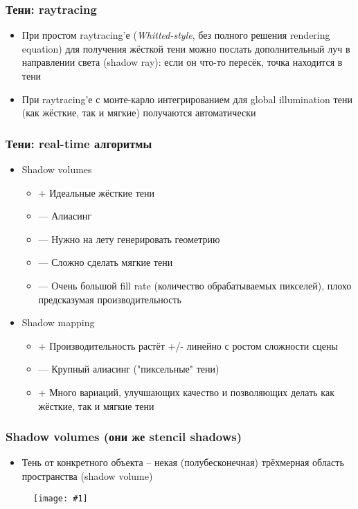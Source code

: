 \documentclass{beamer}
\newcommand{\slideimage}[1]{
  \begin{figure}
    \begin{adjustbox}{width=\textwidth, totalheight=\textheight-2\baselineskip-2\baselineskip,keepaspectratio}
      \texttt{[image: \#1]}
    \end{adjustbox}
  \end{figure}
}
\begin{document}
\begin{frame}[fragile]
\frametitle{Тени: raytracing}
\begin{itemize}
\item При простом raytracing'е (\textit{Whitted-style}, без полного решения rendering equation) для получения жёсткой тени можно послать дополнительный луч в направлении света (shadow ray): если он что-то пересёк, точка находится в тени
\pause
\item При raytracing'е с монте-карло интегрированием для global illumination тени (как жёсткие, так и мягкие) получаются автоматически
\end{itemize}
\end{frame}

\begin{frame}[fragile]
\frametitle{Тени: real-time алгоритмы}
\begin{itemize}
\item Shadow volumes
\pause
\begin{itemize}
\item {\color{green}+} Идеальные жёсткие тени
\item {\color{red}---} Алиасинг
\item {\color{red}---} Нужно на лету генерировать геометрию
\item {\color{red}---} Сложно сделать мягкие тени
\item {\color{red}---} Очень большой fill rate (количество обрабатываемых пикселей), плохо предсказумая производительность
\end{itemize}
\pause
\item Shadow mapping
\pause
\begin{itemize}
\item {\color{green}+} Производительность растёт +/- линейно с ростом сложности сцены
\item {\color{red}---} Крупный алиасинг ("пиксельные" тени)
\item {\color{green}+} Много вариаций, улучшающих качество и позволяющих делать как жёсткие, так и мягкие тени
\end{itemize}
\end{itemize}
\end{frame}

\begin{frame}[fragile]
\frametitle{Shadow volumes (они же stencil shadows)}
\begin{itemize}
\item Тень от конкретного объекта -- некая (полубесконечная) трёхмерная область пространства (shadow volume)
\end{itemize}
\slideimage{shadow-volume.png}
\end{frame}
\end{document}
